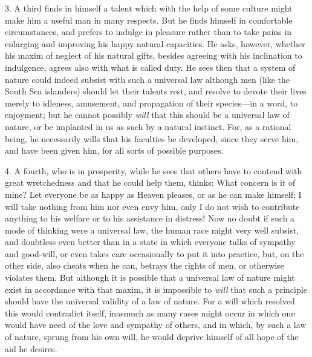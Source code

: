 3. A third finds in himself a talent which with the help of some
culture might make him a useful man in many respects. But he finds
himself in comfortable circumstances, and prefers to indulge in
pleasure rather than to take pains in enlarging and improving his
happy natural capacities. He asks, however, whether his maxim of
neglect of his natural gifts, besides agreeing with his inclination to
indulgence, agrees also with what is called duty. He sees then that a
system of nature could indeed subsist with such a universal law
although men  (like the South Sea islanders) should let their
talents rest, and resolve to devote their lives merely to idleness,
amusement, and propagation of their species---in a word, to enjoyment;
but he cannot possibly \textit{will} that this should be a universal
law of nature, or be implanted in us as such by a natural instinct.
For, as a rational being, he necessarily wills that his faculties be
developed, since they serve him, and have been given him, for all
sorts of possible purposes.

4. A fourth, who is in prosperity, while he sees that others have to
contend with great wretchedness and that he could help them, thinks:
What concern is it of mine? Let everyone be as happy as Heaven
pleases, or as he can make himself; I will take nothing from him nor
even envy him, only I do not wish to contribute anything to his
welfare or to his assistance in distress! Now no doubt if such a mode
of thinking were a universal law, the human race might very well
subsist, and doubtless even better than in a state in which everyone
talks of sympathy and good-will, or even takes care occasionally to
put it into practice, but, on the other side, also cheats when he can,
betrays the rights of men, or otherwise violates them. But although it
is possible that a universal law of nature might exist in accordance
with that maxim, it is impossible to \textit{will} that such a
principle should have the universal validity of a law of nature. For a
will which resolved this would contradict itself, inasmuch as many
cases might occur in which one would have need of the love and
sympathy of others, and in which, by such a law of nature, sprung from
his own will, he would deprive himself of all hope of the aid he
desires.


